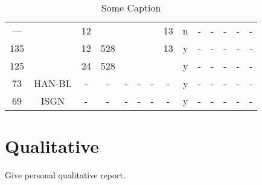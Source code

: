 \begin{table}
\begin{center}
\begin{tabular}{| c c | c c c c c c | c c c c c c |}
        --- &             & 12 &      &     &         &     & 13 &  n & - & - & - & - & - \\
        135 &             & 12 & 528  &     &         &     & 13 &  y & - & - & - & - & - \\
        125 &             & 24 & 528  &     &         &     &    &  y & - & - & - & - & - \\
        \hline
        73  & HAN-BL      &  - &  -   &  -  &    -    &  -  &  - &  y & - & - & - & - & - \\
        69  & ISGN        &  - &  -   &  -  &    -    &  -  &  - &  y & - & - & - & - & - \\
        \hline
    \end{tabular}
    \caption{Some Caption}
    \label{tab:quantitative1}
    \end{center}
\end{table}


\section{Qualitative}
Give personal qualitative report. 